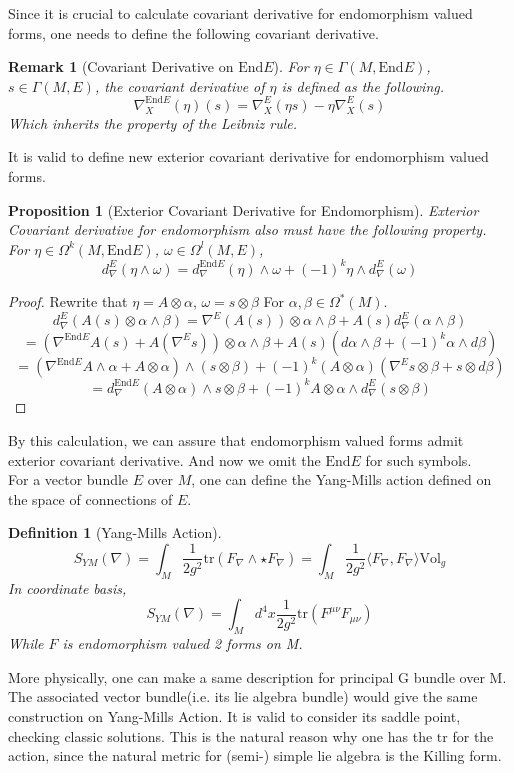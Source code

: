 \documentclass{article}
\newtheorem{defn}{Definition}
\newtheorem{prop}{Proposition}
\newtheorem{rem}{Remark}
\begin{document}
Since it is crucial to calculate covariant derivative for endomorphism valued forms, one needs to define the following covariant derivative. 

\begin{rem}[Covariant Derivative on $\mathrm{End}E$]
    For $\eta\in \Gamma(M,\mathrm{End}E)$, $s\in \Gamma(M,E)$, the covariant derivative of $\eta$ is defined as the following. 
    \[
        \nabla^{\mathrm{End}E}_X(\eta) (s) = \nabla_X^E(\eta s) - \eta \nabla_X^E(s)
    \]
    Which inherits the property of the Leibniz rule. 
\end{rem}

It is valid to define new exterior covariant derivative for endomorphism valued forms. 

\begin{prop}[Exterior Covariant Derivative for Endomorphism]
    Exterior Covariant derivative for endomorphism also must have the following property.
    For $\eta\in\Omega^k(M,\mathrm{End}E)$, $\omega \in \Omega^l(M,E)$,
    \[
        d_\nabla^E(\eta\wedge\omega) = d_\nabla^{\mathrm{End}E}(\eta) \wedge \omega+ (-1)^k \eta\wedge d_\nabla^E(\omega)
    \]
\end{prop}
\begin{proof}
    Rewrite that $\eta = A\otimes \alpha$, $\omega = s \otimes \beta$ For $\alpha,\beta\in\Omega^*(M)$.
    \[
        d_\nabla^E(A(s)\otimes\alpha\wedge\beta) = \nabla^E(A(s))\otimes\alpha\wedge\beta + A(s)d_\nabla^E(\alpha\wedge\beta)
    \]
    \[
        =(\nabla^{\mathrm{End}E}A(s)+A(\nabla^Es))\otimes \alpha \wedge \beta + A(s)(d\alpha\wedge\beta +(-1)^k\alpha\wedge d\beta)
    \]
    \[
        =(\nabla^{\mathrm{End}E}A\wedge\alpha+A\otimes\alpha)\wedge(s\otimes\beta) + (-1)^k(A\otimes\alpha)(\nabla^Es\otimes\beta + s\otimes d\beta)
    \]
    \[
        = d_\nabla^{\mathrm{End}E}(A\otimes\alpha) \wedge s\otimes\beta+ (-1)^k A\otimes \alpha\wedge d_\nabla^E(s\otimes\beta)
    \]
\end{proof}
By this calculation, we can assure that endomorphism valued forms admit exterior covariant derivative. And now we omit the $\mathrm{End}E$ for such symbols. \\
For a vector bundle $E$ over $M$, one can define the Yang-Mills action defined on the space of connections of $E$.

\begin{defn}[Yang-Mills Action] 
\[
    S_{YM}(\nabla) = \int_M \frac{1}{2g^2} \mathrm{tr}(F_\nabla\wedge\star F_\nabla) = \int_M \frac{1}{2g^2} \langle F_\nabla, F_\nabla \rangle \mathrm{Vol}_g
\]
In coordinate basis, 
\[
    S_{YM}(\nabla) = \int_M d^4 x \frac{1}{2g^2} \mathrm{tr}(F^{\mu\nu}F_{\mu \nu})
\] 
While $F$ is endomorphism valued 2 forms on M. 
\end{defn}
More physically, one can make a same description for principal G bundle over M. The associated vector bundle(i.e. its lie algebra bundle) would give the same construction on Yang-Mills Action. It is valid to consider its saddle point, checking classic solutions. This is the natural reason why one has the $\mathrm{tr}$ for the action, since the natural metric for (semi-) simple lie algebra is the Killing form. 
\end{document}
